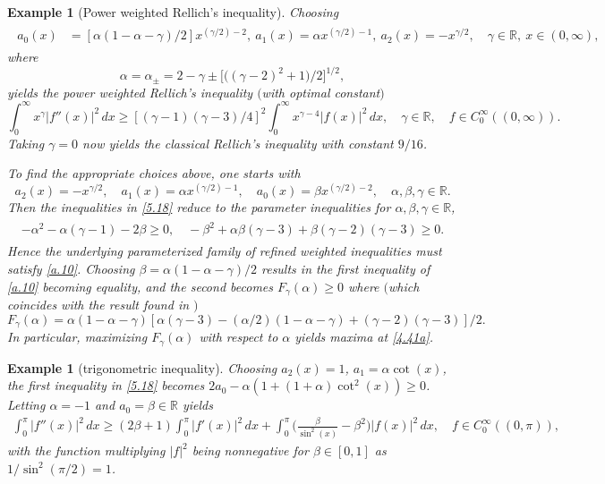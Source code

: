 \documentclass[reqno,10pt,centertags]{amsart}
\newcommand{\bbR}{{\mathbb{R}}}
\renewcommand{\a}{\alpha}
\renewcommand{\b}{\beta}
\newcommand{\g}{\gamma}
\numberwithin{equation}{section}
\newtheorem{example}[theorem]{Example}
\theoremstyle{remark}
\begin{document}
\begin{example}[Power weighted Rellich's inequality] 
Choosing 
\begin{align}
\begin{split}
a_0(x)&=[\a(1-\a-\g)/2 ]x^{(\g/2)-2},\ a_1(x)=\a x^{(\g/2)-1},\ a_2(x)=-x^{\g/2},\quad \g\in\bbR,\ x\in(0,\infty),
\end{split}
\end{align}
where
\begin{equation}\label{4.41a}
\a=\a_\pm=2-\g \pm \big[\big((\g-2)^2+1\big)/2\big]^{1/2},
\end{equation}
yields the power weighted Rellich's inequality $($with optimal constant$)$
\begin{equation}
\int_0^\infty x^\gamma |f''(x)|^2\, dx\geq [(\g-1) (\g - 3) /4]^2\int_0^\infty x^{\gamma-4}|f(x)|^2\, dx,\quad \g\in\bbR,\quad f\in C^\infty_0((0,\infty)).
\end{equation}
Taking $\gamma=0$ now yields the classical Rellich's inequality with constant $9/16$.

To find the appropriate choices above, one starts with
\begin{equation}
a_2(x)=-x^{\g/2},\quad a_1(x)=\a x^{(\g/2)-1},\quad a_0(x)=\b x^{(\g/2)-2},\quad \a,\b,\g\in\bbR.
\end{equation}
Then the inequalities in \eqref{5.18} reduce to the parameter inequalities for $\a,\b,\g\in\bbR$,
\begin{align}\label{a.10}
\begin{split}
-\a^2-\a(\g-1)-2\b\geq0,\quad
-\b^2+\a\b(\g-3)+\b(\g-2)(\g-3)\geq0.
\end{split}
\end{align}
Hence the underlying parameterized family of refined weighted inequalities must satisfy \eqref{a.10}. Choosing $\b=\a(1-\a-\g)/2$ results in the first inequality of \eqref{a.10} becoming equality, and the second becomes $F_\g(\a)\geq0$ where $($which coincides with the result found in \cite[Cor. 2.3]{GPPS23}$)$
\begin{equation}
F_\g(\a)=\a(1-\a-\g)[\a(\g-3)-(\a/2)(1-\a-\g)+(\g-2)(\g-3)]/2.
\end{equation}
In particular, maximizing $F_\g(\alpha)$ with respect to $\alpha$ yields maxima at \eqref{4.41a}.
\end{example}

\begin{example}[trigonometric inequality]
Choosing $a_2(x) = 1$, $a_1 = \alpha \cot(x)$, the first inequality in \eqref{5.18} becomes $2a_0 - \alpha (1+(1+\alpha)\cot^2(x))\geq0 $. Letting $\alpha = -1$ and $a_0=\b\in\mathbb{R}$ yields
\begin{align}
    \label{eq:trigrellich2}
    \int_0^\pi |f''(x)|^2\, dx \geq (2\beta +1)\int_0^\pi |f'(x)|^2\, dx + \int_0^\pi \Big(\frac{\beta}{\sin^2(x)}-\beta^2\Big)|f(x)|^2\, dx,\quad f\in C_0^\infty((0,\pi)),
\end{align}
with the function multiplying $|f|^2$ being nonnegative for $\beta\in[0,1]$ as $1/\sin^2(\pi/2)=1$.
\end{example}
\end{document}
